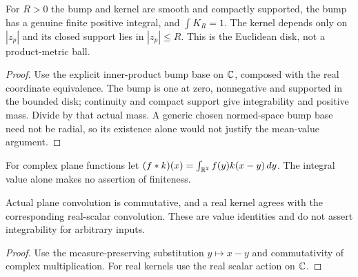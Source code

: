 \begin{lemma}
\label{lem:radial-plane-mean-kernel}
\leanok
For $R>0$ the bump and kernel are smooth and compactly supported,
the bump has a genuine finite positive integral, and $\int K_R=1$.
The kernel depends only on $|z_p|$ and its closed support lies in
$|z_p|\le R$. This is the Euclidean disk, not a product-metric ball.
\end{lemma}

\begin{proof}
\leanok
Use the explicit inner-product bump base on $\mathbb{C}$, composed with the real
coordinate equivalence. The bump is one at zero, nonnegative and supported
in the bounded disk; continuity and compact support give integrability and
positive mass. Divide by that actual mass.
A generic chosen normed-space bump base need not be radial, so its existence
alone would not justify the mean-value argument.
\end{proof}

\begin{definition}
\label{def:plane-convolution}
\leanok
For complex plane functions let
$(f*k)(x)=\int_{\mathbb{R}^2}f(y)k(x-y)\,dy$.
The integral value alone makes no assertion of finiteness.
\end{definition}

\begin{lemma}
\label{lem:plane-convolution-basic}
\leanok
Actual plane convolution is commutative, and a real kernel agrees with the
corresponding real-scalar convolution. These are value identities and do
not assert integrability for arbitrary inputs.
\end{lemma}

\begin{proof}
\leanok
Use the measure-preserving substitution $y\mapsto x-y$ and commutativity
of complex multiplication. For real kernels use the real scalar action on $\mathbb{C}$.
\end{proof}

